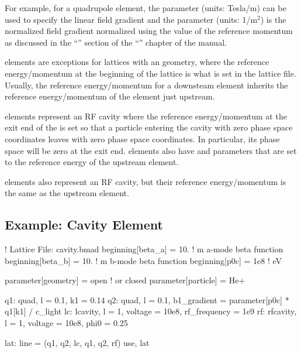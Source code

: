 \documentclass{hitec}     %
\begin{document}
{\begin{description}[labelindent=-17pt,leftmargin=0pt]
For example, for a quadrupole element, the
 parameter (units: Tesla/m) can be used to specify the linear field gradient and the
 parameter (units: 1/m$^2$) is the normalized field gradient normalized using the value of
the reference momentum as discussed in the ``'' section of the
``'' chapter of the \bmad manual.
%
\item[Lcavity] \Newline
  elements are exceptions for lattices with an  geometry, where the reference energy/momentum at the beginning of the lattice is what is set in the lattice file. Usually, the reference energy/momentum for a downsteam element inherits the reference energy/momentum of the element just upstream. 

 elements represent an RF cavity where the reference energy/momentum at the exit end of the  is set so that a particle entering the cavity with zero phase space coordinates leaves with zero phase space coordinates. In particular, its phase space  will be zero at the exit end.   elements also have  and  parameters
that are set to the reference energy of the upstream element. 
%
\item[Rfcavity] \Newline 
{} elements also represent an RF cavity, but their reference energy/momentum is the same as the upstream element.
\end{description}

\subsection{Example: Cavity Element}

\begin{code}
! Lattice File: cavity.bmad
beginning[beta_a] = 10.   ! m  a-mode beta function
beginning[beta_b] = 10.   ! m  b-mode beta function
beginning[p0c] = 1e8   ! eV  

parameter[geometry] = open      ! or closed
parameter[particle] = He+ 

q1: quad, l = 0.1, k1 = 0.14
q2: quad, l = 0.1, b1_gradient = parameter[p0c] * q1[k1] / c_light
lc: lcavity, l = 1, voltage = 10e8, rf_frequency = 1e9
rf: rfcavity, l = 1, voltage = 10e8, phi0 = 0.25

lat: line = (q1, q2, lc, q1, q2, rf)
use, lat
\end{code}

}
\end{document}
